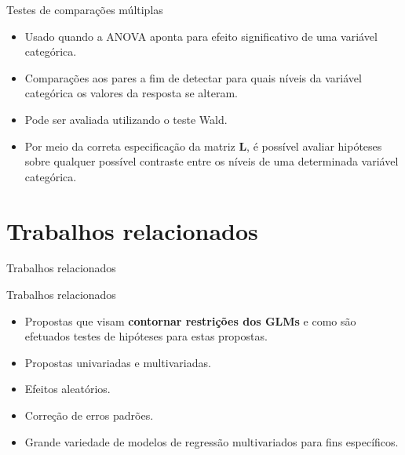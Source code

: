 \documentclass[
  ignorenonframetext,
  serif,
  professionalfont,
  usenames,
  dvipsnames,
  aspectratio = 169]{beamer}
\begin{document}
\begin{frame}{Testes de comparações múltiplas}
\protect\hypertarget{testes-de-comparauxe7uxf5es-muxfaltiplas-1}{}
\begin{itemize}

  \itemsep 2ex

  \item Usado quando a ANOVA aponta para efeito significativo de uma variável categórica.

  \item Comparações aos pares a fim de detectar para quais níveis da variável categórica os valores da resposta se alteram.

  \item Pode ser avaliada utilizando o teste Wald. 

  \item Por meio da correta especificação da matriz $\boldsymbol{L}$, é possível avaliar hipóteses sobre qualquer possível contraste entre os níveis de uma determinada variável categórica. 

\end{itemize}
\end{frame}

\hypertarget{trabalhos-relacionados}{%
\section{Trabalhos relacionados}\label{trabalhos-relacionados}}

\begin{frame}{Trabalhos relacionados}
\end{frame}

\begin{frame}{Trabalhos relacionados}
\protect\hypertarget{trabalhos-relacionados-1}{}
\begin{itemize}
  \itemsep 2ex
  
  \item Propostas que visam \textbf{contornar restrições dos GLMs} e como são efetuados testes de hipóteses para estas propostas.
  
  \item Propostas univariadas e multivariadas.
  
  \item Efeitos aleatórios.
  
  \item Correção de erros padrões.
  
  \item Grande variedade de modelos de regressão multivariados para fins específicos.
  
\end{itemize}
\end{frame}
\end{document}
